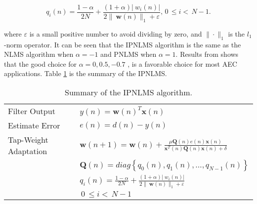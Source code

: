 \vspace{-1.5cm}
\begin{equation}
 q_i(n)=\frac{1-\alpha}{2N}+\frac{(1+\alpha)|\ w_i(n)|}{2\|\ \textbf{w}(n)\|_1+\varepsilon}, \hspace{2pt}0\hspace{2pt}\leq i<\hspace{2pt}N-1. \label{15b}
 \end{equation}

 \vspace{-0.3cm}
\noindent where $\varepsilon$ is a small positive number to avoid dividing by zero, and $\|\cdot\|_1                                                               $ is the $l_1$-norm operator. It can be seen that the IPNLMS algorithm is the same as the NLMS algorithm when $\alpha=-1$ and PNLMS when $\alpha=1$. Results from \cite{Morgan} shows that the good choice for $\alpha=0,0.5,-0.7$ , is a favorable choice for most AEC applications. Table \ref{table:4} is the summary of the IPNLMS.
\begin{table}[ht]
\caption{Summary of the IPNLMS algorithm.}
\vspace{0.5cm}
\centering
\begin{tabular}{ll}
\hline
\hline
 Filter Output  & $y(n)=\textbf{w}(n)^{T}\textbf{x}(n)$\\
 Estimate Error  & $e(n)=d(n)-y(n)$\\
 Tap-Weight Adaptation & $\textbf{w}(n+1)=\textbf{w}(n)+\frac{\mu \textbf{Q}(n)e(n)\textbf{x}(n)}{\textbf{x}^{T}(n)\textbf{Q}(n)\textbf{x}(n)+\delta}$ \\
                    & $ \textbf{Q}(n)=diag\left\{q_0(n),q_1(n),\ldots,q_{N-1}(n)\right\}$\\
                    & $ q_i(n)=\frac{1-\alpha}{2N}+\frac{(1+\alpha)|\ w_i(n)|}{2\|\ \textbf{w}(n)\|_1+\varepsilon}$\\
                    & $\hspace{2pt}0\hspace{2pt}\leq i<\hspace{2pt}N-1$ \\
\hline
\end{tabular}
\label{table:4}
\end{table}

